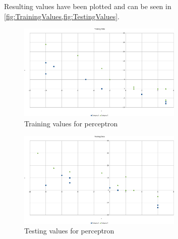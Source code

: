 \documentclass[a4,12pt]{extarticle}
\begin{document}
Resulting values have been plotted and can be seen in \cref{fig:TrainingValues,fig:TestingValues}.
\begin{figure}[H]
  \centering
  \includegraphics[width=0.7\textwidth]{TrainingValues}
  \caption{Training values for perceptron}
  \label{fig:TrainingValues}
\end{figure}
\begin{figure}[H]
  \centering
  \includegraphics[width=0.7\textwidth]{TestingValues}
  \caption{Testing values for perceptron}
  \label{fig:TestingValues}
\end{figure}
\end{document}
